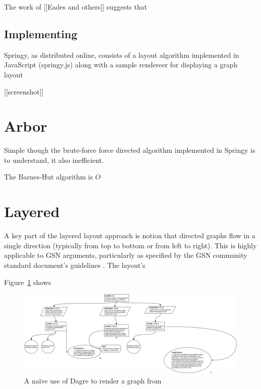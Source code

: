 The work of [[Eades and others]] suggests that

\subsection{Implementing }

Springy, as distributed online, consists of a layout algorithm implemented in JavaScript (springy.js) along with a sample rendereer for displaying a graph layout 

[[screenshot]]



\section{Arbor}

Simple though the brute-force force directed algorithm implemented in Springy is to understand, it also inefficient.

The Barnes-Hut algorithm is $O$



\section{Layered}

A key part of the layered layout approach is notion that directed graphs flow in a single direction (typically from top to bottom or from left to right). This is highly applicable to GSN arguments, particularly as specified by the GSN community standard document's guidelines \cite{gsnstandard}. The layout's 





Figure~\ref{fig:dagre1} shows

\begin{figure}
  \centering
  \includegraphics[width=\textwidth]{graphics/results/a4-dagre.png}
  \caption{A na\"ive use of Dagre to render a graph from \cite{aldenthesis}}
  \label{fig:dagre1}
\end{figure}



